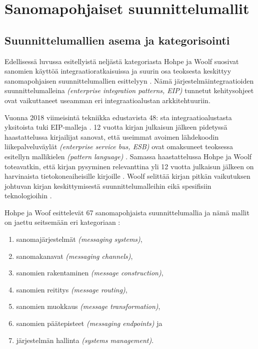 \chapter{Sanomapohjaiset suunnittelumallit}

\section{Suunnittelumallien asema ja kategorisointi}
Edellisessä luvussa esitellyistä neljästä kategoriasta Hohpe ja Woolf suosivat sanomien käyttöä integraatioratkaisuissa ja suurin osa teoksesta keskittyy sanomapohjaisen suunnittelumallien esittelyyn \citep[sivu~76]{Hohpe2004}. Nämä järjestelmäintegraatioiden suunnittelumalleina \textit{(enterprise integration patterns, EIP)} tunnetut kehitysohjeet ovat vaikuttaneet useamman eri integraatioalustan arkkitehtuuriin. 

Vuonna 2018 viimeisintä tekniikka edustavista 48: sta integraatioalustasta yksitoista tuki EIP-malleja \citep{Freire2019}.
12 vuotta kirjan julkaisun jälkeen pidetyssä haastattelussa kirjailijat sanovat, että useimmat avoimen lähdekoodin liikepalveluväylät \textit{(enterprise service bus, ESB)} ovat omaksuneet teoksessa esitellyn mallikielen \textit{(pattern language)} \citep{Zimmermann2016}.
Samassa haastattelussa Hohpe ja Woolf toteavatkin, että kirjan pysyminen relevanttina yli 12 vuotta julkaisun jälkeen on harvinaista tietokoneaiheisille kirjoille \citep{Zimmermann2016}. Woolf selittää kirjan pitkän vaikutuksen johtuvan kirjan keskittymisestä suunnittelumalleihin eikä spesifisiin teknologioihin \citep{Zimmermann2016}.


Hohpe ja Woof esittelevät 67 sanomapohjaista suunnittelumallia ja nämä mallit on jaettu seitsemään eri kategoriaan \citep{Hohpe2004}:


\begin{enumerate}
   \item sanomajärjestelmät \textit{(messaging systems)},
   \item sanomakanavat \textit{(messaging channels)},
   \item sanomien rakentaminen \textit{(message construction)},
   \item sanomien reititys \textit{(message routing)},
   \item sanomien muokkaus \textit{(message transformation)},
   \item sanomien päätepisteet \textit{(messaging endpoints)} ja
   \item järjestelmän hallinta \textit{(systems management)}.
\end{enumerate}

